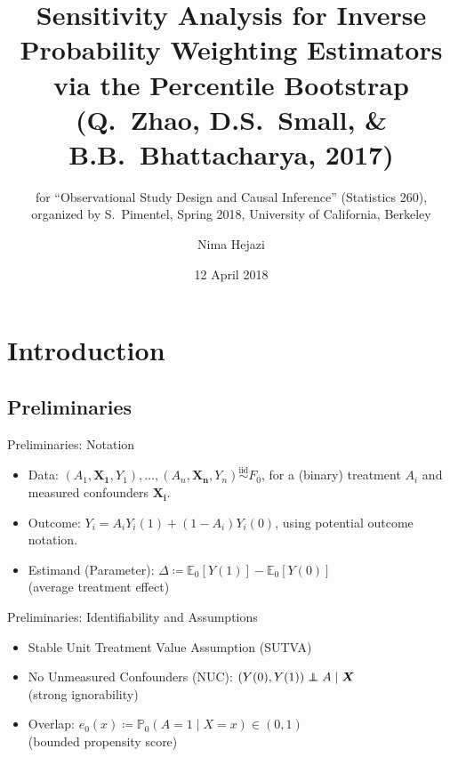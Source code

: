 \documentclass{beamer}
\title[ipw-bootstrap]{Sensitivity Analysis for Inverse Probability Weighting
  Estimators via the Percentile Bootstrap \small (Q.~Zhao, D.S.~Small, \&
  B.B.~Bhattacharya, 2017)}
\subtitle{\vspace*{0.5em} \scriptsize for ``Observational Study Design and
  Causal Inference'' (Statistics 260),\\ organized by S.~Pimentel, Spring 2018,
  University of California, Berkeley}
\author{Nima Hejazi}
\institute{Group in Biostatistics,\\ University of California, Berkeley\\
  \url{https://statistics.berkeley.edu/~nhejazi}
}
\date{12 April 2018}
\newcommand{\E}{\mathbb{E}}
\newcommand{\pr}{\mathbb{P}}
\newcommand\independent{\protect\mathpalette{\protect\independenT}{\perp}}
\def\independenT#1#2{\mathrel{\rlap{$#1#2$}\mkern2mu{#1#2}}}
\begin{document}
\begin{frame}
  \titlepage
\end{frame}

\section{Introduction}
\subsection{Preliminaries}

\begin{frame}{Preliminaries: Notation}

\begin{itemize}
  \itemsep12pt
  \item Data: $(A_1, \bm{X_1}, Y_1), \ldots, (A_n, \bm{X_n}, Y_n)
    \stackrel{\text{iid}}{\sim} F_0$, for a (binary) treatment $A_i$ and
    measured confounders $\bm{X_i}$.
  \item Outcome: $Y_i = A_iY_i(1) + (1 - A_i)Y_i(0)$, using potential outcome
    notation.
  \item Estimand (Parameter): $\Delta \coloneqq \E_0[Y(1)] - \E_0[Y(0)]$\\
    (average treatment effect)
\end{itemize}

\end{frame}


\begin{frame}{Preliminaries: Identifiability and Assumptions}

\begin{itemize}
  \itemsep12pt
  \item Stable Unit Treatment Value Assumption (SUTVA)
  \item No Unmeasured Confounders (NUC): $(Y(0), Y(1)) \independent A \mid
    \bm{X}$\\(strong ignorability)
  \item Overlap: $e_0(x) \coloneqq \pr_0(A = 1 \mid X = x) \in (0, 1)$\\
    (bounded propensity score)
\end{itemize}

\end{frame}
\end{document}
